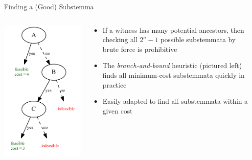 \documentclass[10pt]{beamer}
\begin{document}
	\begin{frame}{Finding a (Good) Substemma}
		\begin{columns}
			\begin{column}{0.4\textwidth}
				\includegraphics[width=\textwidth]{../img/branch-and-bound-example.pdf}
			\end{column}
			\begin{column}{0.55\textwidth}
				\begin{itemize}
					\item If a witness has many potential ancestors, then checking all $2^n - 1$ possible substemmata by brute force is prohibitive
					\item The \emph{branch-and-bound} heuristic (pictured left) finds all minimum-cost substemmata quickly in practice
					\item Easily adapted to find all substemmata within a given cost
				\end{itemize}
			\end{column}
		\end{columns}
	\end{frame}
\end{document}
